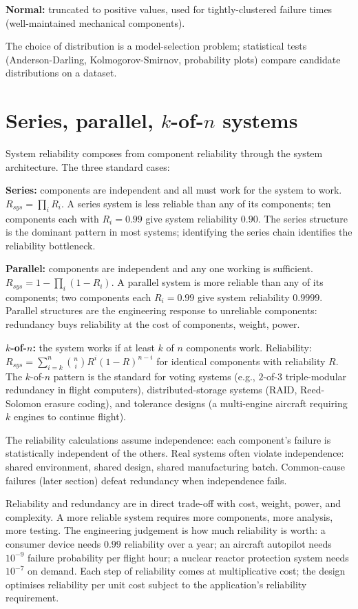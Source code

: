 \textbf{Normal:} truncated to positive values, used for tightly-clustered failure times (well-maintained mechanical components).

The choice of distribution is a model-selection problem; statistical tests (Anderson-Darling, Kolmogorov-Smirnov, probability plots) compare candidate distributions on a dataset.

\section{Series, parallel, $k$-of-$n$ systems}

System reliability composes from component reliability through the system architecture. The three standard cases:

\textbf{Series:} components are independent and all must work for the system to work. $R_{sys} = \prod_i R_i$. A series system is less reliable than any of its components; ten components each with $R_i = 0.99$ give system reliability $0.90$. The series structure is the dominant pattern in most systems; identifying the series chain identifies the reliability bottleneck.

\textbf{Parallel:} components are independent and any one working is sufficient. $R_{sys} = 1 - \prod_i (1 - R_i)$. A parallel system is more reliable than any of its components; two components each $R_i = 0.99$ give system reliability $0.9999$. Parallel structures are the engineering response to unreliable components: redundancy buys reliability at the cost of components, weight, power.

\textbf{$k$-of-$n$:} the system works if at least $k$ of $n$ components work. Reliability: $R_{sys} = \sum_{i=k}^n \binom{n}{i} R^i (1-R)^{n-i}$ for identical components with reliability $R$. The $k$-of-$n$ pattern is the standard for voting systems (e.g., $2$-of-$3$ triple-modular redundancy in flight computers), distributed-storage systems (RAID, Reed-Solomon erasure coding), and tolerance designs (a multi-engine aircraft requiring $k$ engines to continue flight).

The reliability calculations assume independence: each component's failure is statistically independent of the others. Real systems often violate independence: shared environment, shared design, shared manufacturing batch. Common-cause failures (later section) defeat redundancy when independence fails.

\begin{archetype}
Reliability and redundancy are in direct trade-off with cost, weight, power, and complexity. A more reliable system requires more components, more analysis, more testing. The engineering judgement is how much reliability is worth: a consumer device needs $0.99$ reliability over a year; an aircraft autopilot needs $10^{-9}$ failure probability per flight hour; a nuclear reactor protection system needs $10^{-7}$ on demand. Each step of reliability comes at multiplicative cost; the design optimises reliability per unit cost subject to the application's reliability requirement.
\end{archetype}

